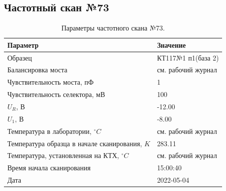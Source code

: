 \subsection{Частотный скан №73}
\begin{table}[!ht]
    \centering
    \caption{Параметры частотного скана №73.}
    \begin{tabular}{|l|l|}
        \hline
        Параметр                                       & Значение                  \\ \hline
        Образец                                        & КТ117№1 п1(база 2)        \\ \hline
        Балансировка моста                             & см. рабочий журнал        \\ \hline
        Чувствительность моста, пФ                     & 1                         \\ \hline
        Чувствительность селектора, мВ                 & 100                       \\ \hline
        $U_R$, В                                       & -12.00                    \\ \hline
        $U_1$, В                                       & -8.00                     \\ \hline
        Температура в лаборатории, $^\circ C$          & см. рабочий журнал        \\ \hline
        Температура образца в начале сканирования, $K$ & 283.11                    \\ \hline
        Температура, установленная на КТХ, $^\circ C$  & см. рабочий журнал        \\ \hline
        Время начала сканирования                      & 15:00:40                  \\ \hline
        Дата                                           & 2022-05-04                \\ \hline
    \end{tabular}
    \label{table:frequency_scan_73}
\end{table}

